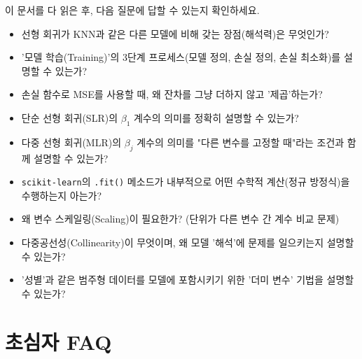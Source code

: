 \documentclass[11pt,a4paper]{book}
\theoremstyle{definition}
\begin{document}
이 문서를 다 읽은 후, 다음 질문에 답할 수 있는지 확인하세요.

\begin{itemize}
    \item [ ] 선형 회귀가 KNN과 같은 다른 모델에 비해 갖는 장점(해석력)은 무엇인가?
    \item [ ] '모델 학습(Training)'의 3단계 프로세스(모델 정의, 손실 정의, 손실 최소화)를 설명할 수 있는가?
    \item [ ] 손실 함수로 MSE를 사용할 때, 왜 잔차를 그냥 더하지 않고 '제곱'하는가?
    \item [ ] 단순 선형 회귀(SLR)의 $\beta_1$ 계수의 의미를 정확히 설명할 수 있는가?
    \item [ ] 다중 선형 회귀(MLR)의 $\beta_j$ 계수의 의미를 "다른 변수를 고정할 때"라는 조건과 함께 설명할 수 있는가?
    \item [ ] \texttt{scikit-learn}의 \texttt{.fit()} 메소드가 내부적으로 어떤 수학적 계산(정규 방정식)을 수행하는지 아는가?
    \item [ ] 왜 변수 스케일링(Scaling)이 필요한가? (단위가 다른 변수 간 계수 비교 문제)
    \item [ ] 다중공선성(Collinearity)이 무엇이며, 왜 모델 '해석'에 문제를 일으키는지 설명할 수 있는가?
    \item [ ] '성별'과 같은 범주형 데이터를 모델에 포함시키기 위한 '더미 변수' 기법을 설명할 수 있는가?
\end{itemize}

\section{초심자 FAQ}
\end{document}
